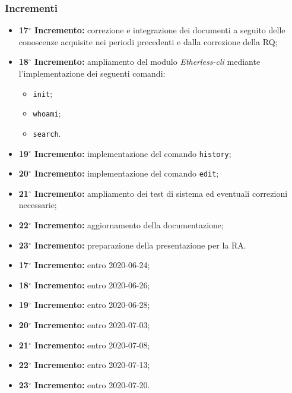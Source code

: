 	\subsubsection{Incrementi}
			\begin{itemize}
				\item \textbf{17$^{\circ}$ Incremento:} correzione e integrazione dei documenti a seguito delle conoscenze acquisite nei periodi precedenti e dalla correzione della RQ;
				\item \textbf{18$^{\circ}$ Incremento:} ampliamento del modulo \textit{Etherless-cli} mediante l'implementazione dei seguenti comandi:
					\begin{itemize}
						\item \texttt{init};
						\item \texttt{whoami};
						\item \texttt{search}.
					\end{itemize}
				\item \textbf{19$^{\circ}$ Incremento:} implementazione del comando \texttt{history};
				\item \textbf{20$^{\circ}$ Incremento:} implementazione del comando \texttt{edit};
				\item \textbf{21$^{\circ}$ Incremento:} ampliamento dei test di sistema ed eventuali correzioni necessarie;
				\item \textbf{22$^{\circ}$ Incremento:} aggiornamento della documentazione;
				\item \textbf{23$^{\circ}$ Incremento:} preparazione della presentazione per la RA.
			\end{itemize}
			\begin{itemize}
				\item \textbf{17$^{\circ}$ Incremento:} entro 2020-06-24;
				\item \textbf{18$^{\circ}$ Incremento:} entro 2020-06-26;
				\item \textbf{19$^{\circ}$ Incremento:} entro 2020-06-28;
				\item \textbf{20$^{\circ}$ Incremento:} entro 2020-07-03;
				\item \textbf{21$^{\circ}$ Incremento:} entro 2020-07-08;
				\item \textbf{22$^{\circ}$ Incremento:} entro 2020-07-13;
				\item \textbf{23$^{\circ}$ Incremento:} entro 2020-07-20.
			\end{itemize}

